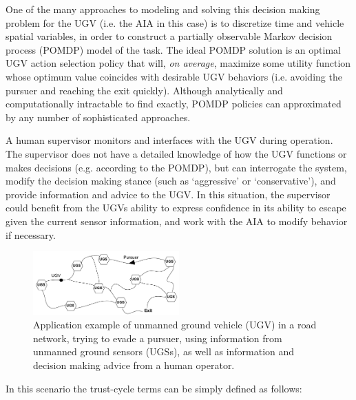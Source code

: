 One of the many approaches to modeling and solving this decision making problem for the UGV (i.e. the AIA in this case) is to discretize time and vehicle spatial variables, in order to construct a partially observable Markov decision process (POMDP) model of the task. 
The ideal POMDP solution is an optimal UGV action selection policy that will, \emph{on average}, maximize some utility function whose optimum value coincides with desirable UGV behaviors (i.e. avoiding the pursuer and reaching the exit quickly). 
Although analytically and computationally intractable to find exactly, POMDP policies can approximated by any number of sophisticated approaches.

    A human supervisor monitors and interfaces with the UGV during operation. The supervisor does not have a detailed knowledge of how the UGV functions or makes decisions (e.g. according to the POMDP), but can interrogate the system, modify the decision making stance (such as `aggressive' or `conservative'), and provide information and advice to the UGV. In this situation, the supervisor could benefit from the UGVs ability to express confidence in its ability to escape given the current sensor information, and work with the AIA to modify behavior if necessary. 
    
	\begin{figure}[htbp]
    	\centering
     	\includegraphics[width=0.5\textwidth]{Figures/RoadNet}
    	\caption{Application example of unmanned ground vehicle (UGV) in a road network, trying to evade a pursuer, using information from unmanned ground sensors (UGSs), as well as information and decision making advice from a human operator.} %
        \label{fig:RoadNet}
    \end{figure}

    In this scenario the trust-cycle terms can be simply defined as follows:

